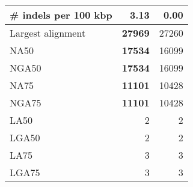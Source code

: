 \documentclass[12pt,a4paper]{article}
\begin{document}
\begin{table}[ht]
\begin{center}
\begin{tabular}{|l*{2}{|r}|}
\# indels per 100 kbp & 3.13 & {\bf 0.00} \\ \hline
Largest alignment & {\bf 27969} & 27260 \\ \hline
NA50 & {\bf 17534} & 16099 \\ \hline
NGA50 & {\bf 17534} & 16099 \\ \hline
NA75 & {\bf 11101} & 10428 \\ \hline
NGA75 & {\bf 11101} & 10428 \\ \hline
LA50 & 2 & 2 \\ \hline
LGA50 & 2 & 2 \\ \hline
LA75 & 3 & 3 \\ \hline
LGA75 & 3 & 3 \\ \hline
\end{tabular}
\end{center}
\end{table}
\end{document}
